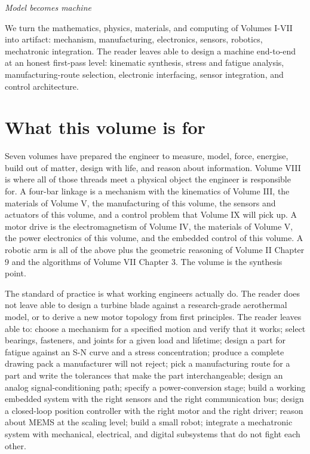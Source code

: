 
\vspace*{1.5cm}
\begin{center}
\itshape\large
Model becomes machine
\end{center}
\vspace{0.5cm}

\noindent
We turn the mathematics, physics, materials, and computing of Volumes I-VII into artifact: mechanism, manufacturing, electronics, sensors, robotics, mechatronic integration. The reader leaves able to design a machine end-to-end at an honest first-pass level: kinematic synthesis, stress and fatigue analysis, manufacturing-route selection, electronic interfacing, sensor integration, and control architecture.

\vspace{0.5cm}

\section*{What this volume is for}

Seven volumes have prepared the engineer to measure, model, force, energise, build out of matter, design with life, and reason about information. Volume VIII is where all of those threads meet a physical object the engineer is responsible for. A four-bar linkage is a mechanism with the kinematics of Volume III, the materials of Volume V, the manufacturing of this volume, the sensors and actuators of this volume, and a control problem that Volume IX will pick up. A motor drive is the electromagnetism of Volume IV, the materials of Volume V, the power electronics of this volume, and the embedded control of this volume. A robotic arm is all of the above plus the geometric reasoning of Volume II Chapter 9 and the algorithms of Volume VII Chapter 3. The volume is the synthesis point.

The standard of practice is what working engineers actually do. The reader does not leave able to design a turbine blade against a research-grade aerothermal model, or to derive a new motor topology from first principles. The reader leaves able to: choose a mechanism for a specified motion and verify that it works; select bearings, fasteners, and joints for a given load and lifetime; design a part for fatigue against an S-N curve and a stress concentration; produce a complete drawing pack a manufacturer will not reject; pick a manufacturing route for a part and write the tolerances that make the part interchangeable; design an analog signal-conditioning path; specify a power-conversion stage; build a working embedded system with the right sensors and the right communication bus; design a closed-loop position controller with the right motor and the right driver; reason about MEMS at the scaling level; build a small robot; integrate a mechatronic system with mechanical, electrical, and digital subsystems that do not fight each other.

